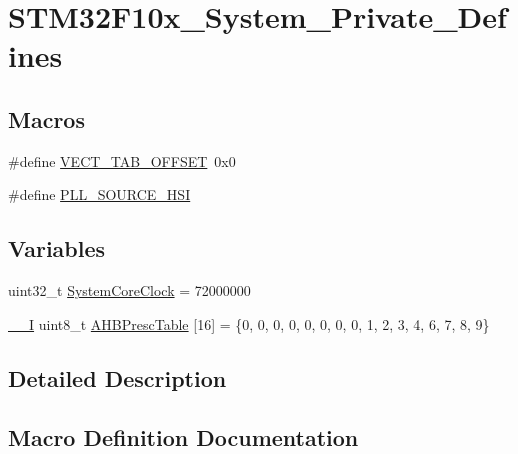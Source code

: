 \hypertarget{group___s_t_m32_f10x___system___private___defines}{}\section{S\+T\+M32\+F10x\+\_\+\+System\+\_\+\+Private\+\_\+\+Defines}
\label{group___s_t_m32_f10x___system___private___defines}
\subsection*{Macros}
\begin{DoxyCompactItemize}
\item 
\#define \mbox{\hyperlink{group___s_t_m32_f10x___system___private___defines_ga40e1495541cbb4acbe3f1819bd87a9fe}{V\+E\+C\+T\+\_\+\+T\+A\+B\+\_\+\+O\+F\+F\+S\+ET}}~0x0
\item 
\#define \mbox{\hyperlink{group___s_t_m32_f10x___system___private___defines_gaeed3dd9022f9d616e8b951cbc49a29bd}{P\+L\+L\+\_\+\+S\+O\+U\+R\+C\+E\+\_\+\+H\+SI}}
\end{DoxyCompactItemize}
\subsection*{Variables}
\begin{DoxyCompactItemize}
\item 
uint32\+\_\+t \mbox{\hyperlink{group___s_t_m32_f10x___system___private___defines_gaa3cd3e43291e81e795d642b79b6088e6}{System\+Core\+Clock}} = 72000000
\item 
\mbox{\hyperlink{core__sc300_8h_af63697ed9952cc71e1225efe205f6cd3}{\+\_\+\+\_\+I}} uint8\+\_\+t \mbox{\hyperlink{group___s_t_m32_f10x___system___private___defines_gacdc3ef54c0704c90e69a8a84fb2d970d}{A\+H\+B\+Presc\+Table}} \mbox{[}16\mbox{]} = \{0, 0, 0, 0, 0, 0, 0, 0, 1, 2, 3, 4, 6, 7, 8, 9\}
\end{DoxyCompactItemize}


\subsection{Detailed Description}


\subsection{Macro Definition Documentation}
\mbox{\label{group___s_t_m32_f10x___system___private___defines_gaeed3dd9022f9d616e8b951cbc49a29bd}} 
